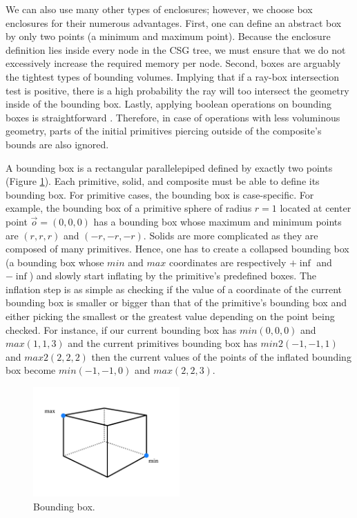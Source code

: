 \documentclass[a4paper,11pt,oneside]{article}
\begin{document}
We can also use many other types of enclosures; however, we choose box enclosures for their numerous advantages. First, one can define an abstract box by only two points (a minimum and maximum point). Because the enclosure definition lies inside every node in the CSG tree, we must ensure that we do not excessively increase the required memory per node. Second, boxes are arguably the tightest types of bounding volumes. Implying that if a ray-box intersection test is positive, there is a high probability the ray will too intersect the geometry inside of the bounding box. Lastly, applying boolean operations on bounding boxes is straightforward \cite{ROTH1982109}. Therefore, in case of operations with less voluminous geometry, parts of the initial primitives piercing outside of the composite's bounds are also ignored.

A bounding box is a rectangular parallelepiped defined by exactly two points (Figure \ref{sec4.2:box-points}). Each primitive, solid, and composite must be able to define its bounding box. For primitive cases, the bounding box is case-specific. For example, the bounding box of a primitive sphere of radius $r = 1$ located at center point $\vec{o} = (0, 0, 0)$ has a bounding box whose maximum and minimum points are $(r, r, r)$ and $(-r, -r, -r)$. Solids are more complicated as they are composed of many primitives. Hence, one has to create a collapsed bounding box (a bounding box whose $min$ and $max$ coordinates are respectively $+\inf$ and $-\inf$) and slowly start inflating by the primitive's predefined boxes. The inflation step is as simple as checking if the value of a coordinate of the current bounding box is smaller or bigger than that of the primitive's bounding box and either picking the smallest or the greatest value depending on the point being checked. For instance, if our current bounding box has $min(0, 0, 0)$ and $max(1, 1, 3)$ and the current primitives bounding box has $min2(-1, -1, 1)$ and $max2(2, 2, 2)$ then the current values of the points of the inflated bounding box become $min(-1, -1, 0)$ and $max(2, 2, 3)$.


\begin{figure}[ht]
	\begin{center}
		\includegraphics[width=0.5\textwidth]{section4/4.2/box-enclosure-points.png}
	\end{center}
	\caption{Bounding box.}
	\label{sec4.2:box-points}
\end{figure}
\end{document}

